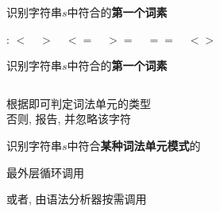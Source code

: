 \begin{frame}{}
  \begin{center}
    识别字符串$s$中符合的{\bf 第一个词素}

    \vspace{0.60cm}
    \relop: $< \quad > \quad <= \quad >= \quad == \quad <>$

    \vspace{0.60cm}
  \end{center}
\end{frame}

\begin{frame}{}
  \begin{center}
    识别字符串$s$中符合的{\bf 第一个词素} 
  \end{center}

  \begin{columns}
  \end{columns}

  \pause
  \vspace{0.30cm}
  \begin{center}
    根据即可判定词法单元的类型 \\[8pt]
    \pause
    否则, 报告, 并忽略该字符
  \end{center}
\end{frame}

\begin{frame}{}
  \begin{center}
    识别字符串$s$中符合{\bf 某种词法单元模式}的

    \vspace{1.00cm}
    最外层循环调用 

    \vspace{0.60cm}
    或者, 由语法分析器按需调用 
  \end{center}
\end{frame}
